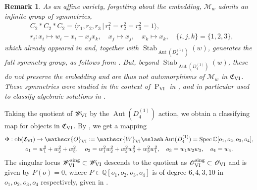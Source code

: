 \documentclass[a4paper,reqno]{amsart}
\numberwithin{equation}{section}
\newcommand{\C}{\mathbb{C}}
\newcommand{\pain}[1]{\operatorname{P}_{\mathrm{#1}}}
\DeclareMathOperator{\Spec}{Spec}
\DeclareMathOperator{\Aut}{Aut}
\newtheorem{remark}[theorem]{Remark}
\numberwithin{equation}{section}
\begin{document}
\begin{remark}
    As an affine variety, forgetting about the embedding, $\mathcal{M}_w$ admits an infinite group of symmetries,
    \begin{align*}
        &C_2*C_2*C_2=\langle r_1,r_2,r_3\,|\, r_1^2=r_2^2=r_3^2=1\rangle,\\
       & r_i:x_i\mapsto w_i-x_i-x_jx_k,\quad x_j\mapsto x_j,\quad x_k\mapsto x_k,\quad \{i,j,k\}=\{1,2,3\},
    \end{align*}
     which already appeared in \cite[Sec. ${\rm{IV}}$]{fricke1904} and, together with $\operatorname{Stab}_{\Aut(D_4^{(1)})}\left(w\right)$, generates the full symmetry group, as follows from \cite[Th. 2]{ElHuti}.
   But, beyond $\operatorname{Stab}_{\Aut(D_4^{(1)})}\left(w\right)$, these do not preserve the embedding and are thus not automorphisms of $\mathcal{M}_w$ in $\mathfrak{C}_{\rm{VI}}$.
    These symmetries were studied in the context of $\pain{VI}$ in \cites{IwasakiModular, CantatLoray}, and in particular used to classify algebraic solutions in \cites{dubrovinmazzocco,lisovyyalgebraic}.
\end{remark}



Taking the quotient of $\mathscr{W}_{\rm{VI}}$ by the $\Aut(D_4^{(1)})$ action, we obtain a classifying map for objects in $\mathfrak{C}_{\rm{VI}}$.
By , we get a mapping 
\begin{equation}\label{eq:moduli_map}
\begin{gathered}
     \Phi : \operatorname{ob}(\mathfrak{C}_{\mathrm{VI}}) \to \mathscr{O}_{\mathrm{VI}} := \mathscr{W}_{\rm{VI}}\sslash\Aut(D_4^{(1)}) = \Spec \C[o_1,o_2,o_3,o_4],\\
    o_1 = w_1^2+w_2^2+w_3^2, \quad o_2= w_1^2w_2^2+w_2^2w_3^2+w_3^2w_1^2, \quad o_3 = w_1w_2w_3, \quad o_4=w_4.
    \end{gathered}
    \end{equation}
    The singular locus $\mathscr{W}_{\rm{VI}}^{\operatorname{sing}}\subset \mathscr{W}_{\rm{VI}}$ descends to the quotient as $\mathscr{O}_{\rm{VI}}^{\operatorname{sing}}\subset \mathscr{O}_{\rm{VI}}$ and is given by $P(o)=0$, where $P\in \mathbb{Q}[o_1,o_2,o_3,o_4]$ is of degree $6,4,3,10$ in $o_1,o_2,o_3,o_4$ respectively, given in .
\end{document}
